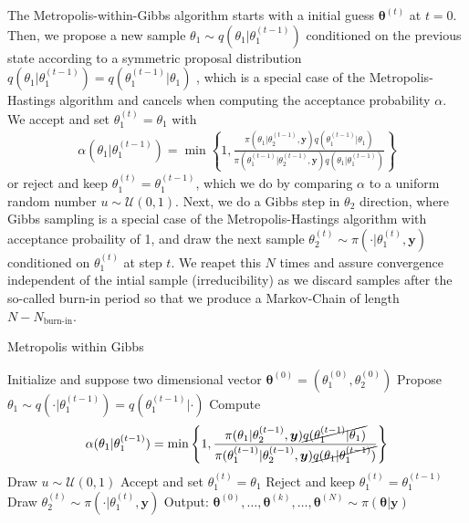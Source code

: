 The Metropolis-within-Gibbs algorithm starts with a initial guess $\bm{\theta}^{(t)}$ at $t=0$.
Then, we propose a new sample $\theta_1 \sim q( \theta_1 | \theta^{(t-1)}_1 )$ conditioned on the previous state according to a symmetric proposal distribution $q(\theta_1 | \theta^{(t-1)}_1 ) = q( \theta^{(t-1)}_1|\theta_1 ) $ , which is a special case of the Metropolis-Hastings algorithm \cite{roberts2006harris} and cancels when computing the acceptance probability $\alpha$. We accept and set $ \theta^{(t)}_1 = \theta_1$ with
\begin{align}
\alpha( \theta_1  | \theta_1^{(t-1)}) = \min \left\{ 1, \frac{\pi(\theta_1  | \theta^{(t-1)}_2, \bm{y}) q(\theta_1^{(t-1)} | \theta_1 )  }{\pi(\theta_1^{(t-1)}| \theta_2^{(t-1)}, \bm{y}) q(\theta_1 | \theta_1^{(t-1)})}  \right\}
\end{align}
or reject and keep $\theta^{(t)}_1 = \theta^{(t-1)}_1$, which we do by comparing $\alpha$ to a uniform random number $u \sim \mathcal{U}(0,1)$.
Next, we do a Gibbs step in $\theta_2$ direction, where Gibbs sampling is a special case of the Metropolis-Hastings algorithm with acceptance probaility of 1, and draw the next sample $\theta_2^{(t)} \sim  \pi( \cdot | \theta_1^{(t)} , \bm{y} ) $ conditioned on $\theta_1^{(t)}$ at step $t$.
We reapet this $N$ times and assure convergence independent of the intial sample (irreducibility) as we discard samples after the so-called burn-in period so that we produce a Markov-Chain of length $N - N_{\text{burn-in}}$.


\begin{algorithm}[!ht]
	\caption{Metropolis within Gibbs}
	\begin{algorithmic}[1]
		\STATE Initialize and suppose two dimensional vector \( \bm{\theta}^{(0)}  =( \theta_1^{(0)} , \theta_2^{(0)}  ) \)
		\STATE Propose \( \theta_1 \sim q(\cdot   | \theta_1 ^{(t-1)}) = q(\theta_1 ^{(t-1)} |\cdot  ) \)
		\STATE Compute
		\[ \alpha( \theta_1  | \theta_1^{(t-1)}) = \min \left\{ 1, \frac{\pi(\theta_1  | \theta^{(t-1)}_2, \bm{y}) \cancel{q(\theta_1^{(t-1)} | \theta_1 ) } }{\pi(\theta_1^{(t-1)}| \theta_2^{(t-1)}, \bm{y}) \cancel{q(\theta_1 | \theta_1^{(t-1)})} } \right\} \]
		\STATE Draw $u \sim \mathcal{U}(0,1)$
		\STATE Accept and set \( \theta_1^{(t)} = \theta_1 \)
		\ELSE  
		\STATE Reject and keep \(\theta_1^{(t)} = \theta_1^{(t-1)} \)
		\ENDIF
		\STATE Draw \(\theta_2^{(t)} \sim  \pi( \cdot | \theta_1^{(t)} , \bm{y} )\) 
		\ENDFOR
		\STATE Output: $ \bm{\theta}^{(0)}, \dots,  \bm{\theta}^{(k)} , \dots,   \bm{\theta}^{(N)} \sim \pi(\bm{\theta}| \bm{y}) $
	\end{algorithmic}
\end{algorithm}




